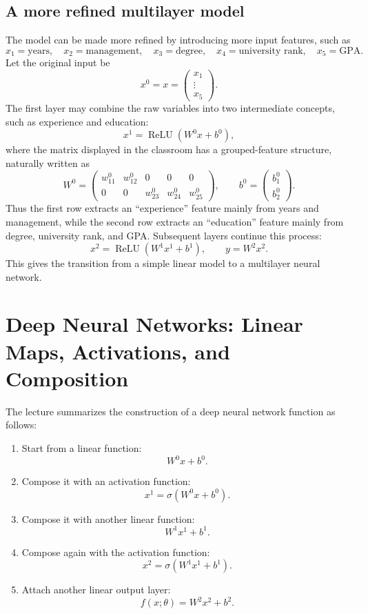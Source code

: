\documentclass[11pt,a4paper]{article}
\newcommand{\ReLU}{\operatorname{ReLU}}
\theoremstyle{definition}
\theoremstyle{plain}
\theoremstyle{remark}
\theoremstyle{plain}
\begin{document}
\subsection{A more refined multilayer model}
The model can be made more refined by introducing more input features, such as
\[
  x_1=\text{years},\quad
  x_2=\text{management},\quad
  x_3=\text{degree},\quad
  x_4=\text{university rank},\quad
  x_5=\text{GPA}.
\]
Let the original input be
\[
  x^0=x=\begin{pmatrix}x_1\\ \vdots \\ x_5\end{pmatrix}.
\]
The first layer may combine the raw variables into two intermediate concepts, such as experience and education:
\[
  x^1=\ReLU(W^0x+b^0),
\]
where the matrix displayed in the classroom has a grouped-feature structure, naturally written as
\[
  W^0=
  \begin{pmatrix}
    w_{11}^0 & w_{12}^0 & 0 & 0 & 0\\
    0 & 0 & w_{23}^0 & w_{24}^0 & w_{25}^0
  \end{pmatrix},
  \qquad
  b^0=\begin{pmatrix}b_1^0\\b_2^0\end{pmatrix}.
\]
Thus the first row extracts an ``experience'' feature mainly from years and management, while the second row extracts an ``education'' feature mainly from degree, university rank, and GPA. Subsequent layers continue this process:
\[
  x^2=\ReLU(W^1x^1+b^1),
  \qquad
  y=W^2x^2.
\]
This gives the transition from a simple linear model to a multilayer neural network.

\section{Deep Neural Networks: Linear Maps, Activations, and Composition}

The lecture summarizes the construction of a deep neural network function as follows:
\begin{enumerate}
  \item Start from a linear function:
  \[
    W^0x+b^0.
  \]
  \item Compose it with an activation function:
  \[
    x^1=\sigma(W^0x+b^0).
  \]
  \item Compose it with another linear function:
  \[
    W^1x^1+b^1.
  \]
  \item Compose again with the activation function:
  \[
    x^2=\sigma(W^1x^1+b^1).
  \]
  \item Attach another linear output layer:
  \[
    f(x;\theta)=W^2x^2+b^2.
  \]
\end{enumerate}
\end{document}
